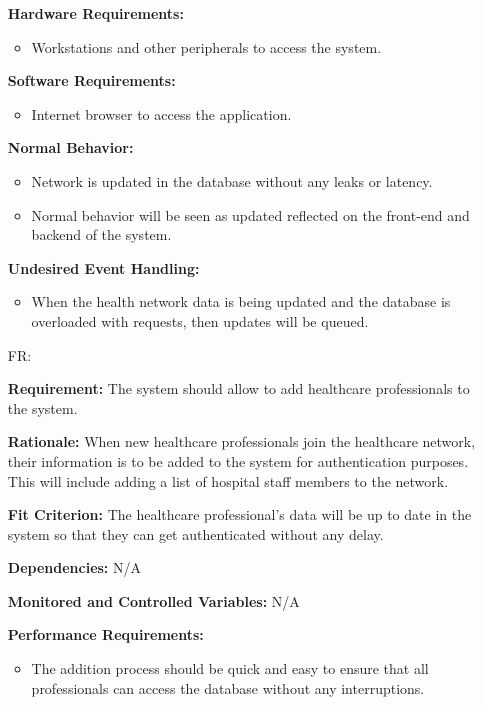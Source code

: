 \documentclass[12pt]{article}
\newcounter{reqnum} %
\begin{document}
\begin{itemize}
\textbf{Hardware Requirements:} 
\begin{itemize}
  \item Workstations and other peripherals to access the system.
\end{itemize}

\textbf{Software Requirements:} 
\begin{itemize}
  \item Internet browser to access the application.
\end{itemize}

\textbf{Normal Behavior:}
\begin{itemize}
  \item Network is updated in the database without any leaks or latency.
  \item Normal behavior will be seen as updated reflected on the front-end and backend of the system.
\end{itemize} 

\textbf{Undesired Event Handling:} 
\begin{itemize}
  \item When the health network data is being updated and the database is overloaded with requests, then updates will be queued.
\end{itemize}

\item[FR\refstepcounter{reqnum}\thereqnum \label{FR_AddHealthProfessional}:]

\textbf{Requirement:} The system should allow to add healthcare professionals to the system.

\textbf{Rationale:} When new healthcare professionals join the healthcare network, their information is to be added to the system for authentication purposes. This will include adding a list of hospital staff members to the network.

\textbf{Fit Criterion:} The healthcare professional’s data will be up to date in the system so that they can get authenticated without any delay. 

\textbf{Dependencies:} N/A 

\textbf{Monitored and Controlled Variables:} N/A

\textbf{Performance Requirements:} 
\begin{itemize}
  \item The addition process should be quick and easy to ensure that all professionals can access the database without any interruptions.
\end{itemize}


\end{itemize}
\end{document}
